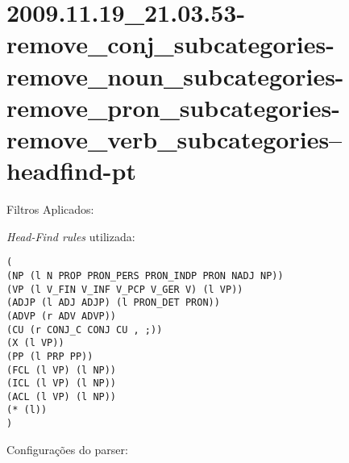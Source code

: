 \section{2009.11.19_21.03.53-remove_conj_subcategories-remove_noun_subcategories-remove_pron_subcategories-remove_verb_subcategories--headfind-pt} %
\label{sec:exp:2009.11.19_21.03.53-remove_conj_subcategories-remove_noun_subcategories-remove_pron_subcategories-remove_verb_subcategories--headfind-pt}

Filtros Aplicados:

\begin{itemize}
  
  \item{\emph{RemoveConjSubcategories}
  
  \item{\emph{RemoveNounSubcategories}
  
  \item{\emph{RemovePronSubcategories}
  
  \item{\emph{RemoveVerbSubcategories}
  
\end{itemize}

\emph{Head-Find rules} utilizada:

\scriptsize
\begin{verbatim}
(
(NP (l N PROP PRON_PERS PRON_INDP PRON NADJ NP))
(VP (l V_FIN V_INF V_PCP V_GER V) (l VP))
(ADJP (l ADJ ADJP) (l PRON_DET PRON))
(ADVP (r ADV ADVP))
(CU (r CONJ_C CONJ CU , ;))
(X (l VP))
(PP (l PRP PP))
(FCL (l VP) (l NP))
(ICL (l VP) (l NP))
(ACL (l VP) (l NP))
(* (l))
)

\end{verbatim}

\normalsize

Configurações do parser:

